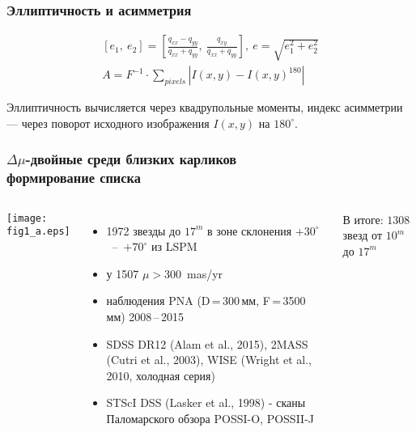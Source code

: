 \begin{frame}
\frametitle{Эллиптичность и асимметрия}
\begin{center}
{\small
\begin{align*}
\left[e_1,~e_2\right] = \left[\frac{q_{xx}-q_{yy}}{q_{xx}+q_{yy}},~\frac{q_{xy}}{q_{xx}+q_{yy}}\right],\: e = \sqrt{e_1^2+e_2^2}\\[15pt]
A = F^{-1}\cdot \sum_{pixels} |I(x,y)-I(x,y)^{180}|
\end{align*}
}
\end{center}
{\footnotesize
	Эллиптичность вычисляется через квадрупольные моменты, индекс асимметрии --- через поворот исходного изображения $I(x,y)$ на $180^\circ$.
}
\end{frame}


\begin{frame}
\frametitle{$\Delta\mu$-двойные среди близких карликов\\{\small формирование списка}}
\begin{columns}
	\texttt{[image: fig1\_a.eps]}
{\scriptsize
\begin{itemize}
\item[] 1972 звезды до $17^m$ в зоне склонения $+30^{\circ}$~--~$+70^{\circ}$ из LSPM\\[10pt]
\item[] у 1507 $\mu > 300$~mas/yr\\[10pt]
\item[] наблюдения PNA (D\,=\,300\,мм, F\,=\,3500\,мм) 2008\,--\,2015\\[10pt]
\item[] SDSS DR12 (Alam et al., 2015), 2MASS (Cutri et al., 2003), WISE (Wright et al., 2010, холодная серия)\\[10pt]
\item[]STScI DSS (Lasker et al., 1998) - сканы Паломарского обзора POSSI-O, POSSII-J\\[10pt]
\end{itemize}
В итоге: $1308$ звезд от $10^m$ до $17^m$
}
\end{columns}
\end{frame}

